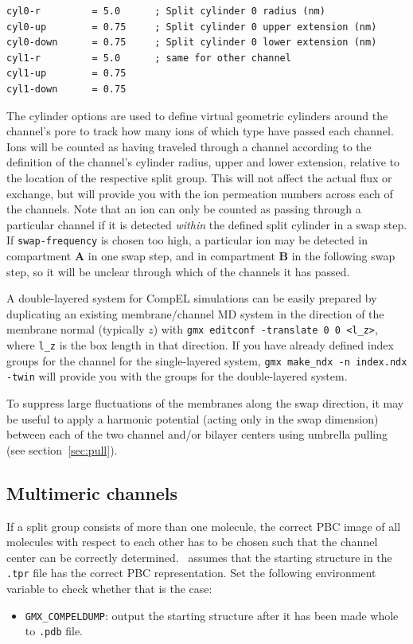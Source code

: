 {\small
\begin{verbatim}
cyl0-r         = 5.0      ; Split cylinder 0 radius (nm)
cyl0-up        = 0.75     ; Split cylinder 0 upper extension (nm)
cyl0-down      = 0.75     ; Split cylinder 0 lower extension (nm)
cyl1-r         = 5.0      ; same for other channel
cyl1-up        = 0.75
cyl1-down      = 0.75
\end{verbatim}}
The cylinder options are used to define virtual geometric cylinders around the
channel's pore to track how many ions of which type have passed each channel.
Ions will be counted as having traveled through a channel
according to the definition of the channel's cylinder radius, upper and lower extension,
relative to the location of the respective split group. This will not affect the actual
flux or exchange, but will provide you with the ion permeation numbers across
each of the channels. Note that an ion can only be counted as passing through a particular
channel if it is detected \emph{within} the defined split cylinder in a swap step.
If {\tt swap-frequency} is chosen too high, a particular ion may be detected in compartment {\bf A}
in one swap step, and in compartment {\bf B} in the following swap step, so it will be unclear
through which of the channels it has passed.

A double-layered system for CompEL simulations can be easily prepared by
duplicating an existing membrane/channel MD system in the direction of the membrane
normal (typically $z$) with {\tt gmx editconf -translate 0 0 <l_z>}, where {\tt l_z}
is the box length in that direction. If you have already defined index groups for
the channel for the single-layered system, {\tt gmx make_ndx -n index.ndx -twin} will
provide you with the groups for the double-layered system.

To suppress large fluctuations of the membranes along the swap direction,
it may be useful to apply a harmonic potential (acting only in the swap dimension)
between each of the two channel and/or bilayer centers using umbrella pulling
(see section~\ref{sec:pull}).

\subsection*{Multimeric channels}
If a split group consists of more than one molecule, the correct PBC image of all molecules
with respect to each other has to be chosen such that the channel center can be correctly
determined. \gromacs\ assumes that the starting structure in the {\tt .tpr}
file has the correct PBC representation. Set the following environment variable
to check whether that is the case:
\begin{itemize}
\item   {\tt GMX_COMPELDUMP}: output the starting structure after it has been made whole to
        {\tt .pdb} file.
\end{itemize}


